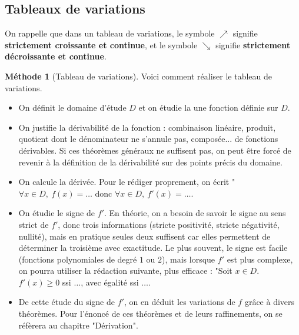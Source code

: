 \documentclass[french]{book}
\theoremstyle{plain}
\theoremstyle{definition}
\newtheorem{met}{Méthode}[chapter]
\theoremstyle{remark}
\begin{document}
\subsection{Tableaux de variations}
On rappelle que dans un tableau de variations, le symbole $\nearrow$ signifie \textbf{strictement croissante et continue}, et le symbole $\searrow$ signifie \textbf{strictement décroissante et continue}.
\begin{met}[Tableau de variations]
	Voici comment réaliser le tableau de variations. 
	\begin{itemize}
		\item On définit le domaine d'étude $D$ et on étudie la une fonction définie sur $D$.
		\item On justifie la dérivabilité de la fonction : combinaison linéaire, produit, quotient dont le dénominateur ne s'annule pas, composée... de fonctions dérivables. Si ces théorèmes généraux ne suffisent pas, on peut être forcé de revenir à la définition de la dérivabilité sur des points précis du domaine.
		\item On calcule la dérivée. Pour le rédiger proprement, on écrit "$\forall x\in D,\ f(x)=\ldots$ donc $\forall x\in D,\ f'(x)=\ldots$.
		\item On étudie le signe de $f'$. En théorie, on a besoin de savoir le signe au sens strict de $f'$, donc trois informations (stricte positivité, stricte négativité, nullité), mais en pratique seules deux suffisent car elles permettent de déterminer la troisième avec exactitude. Le plus souvent, le signe est facile (fonctions polynomiales de degré $1$ ou $2$), mais lorsque $f'$ est plus complexe, on pourra utiliser la rédaction suivante, plus efficace : "Soit $x\in D$. $f'(x)\geqslant 0$ ssi $\ldots$, avec égalité ssi $\ldots$.
		\item De cette étude du signe de $f'$, on en déduit les variations de $f$ grâce à divers théorèmes. Pour l'énoncé de ces théorèmes et de leurs raffinements, on se réfèrera au chapitre "Dérivation".
	\end{itemize}
\end{met}
\end{document}
